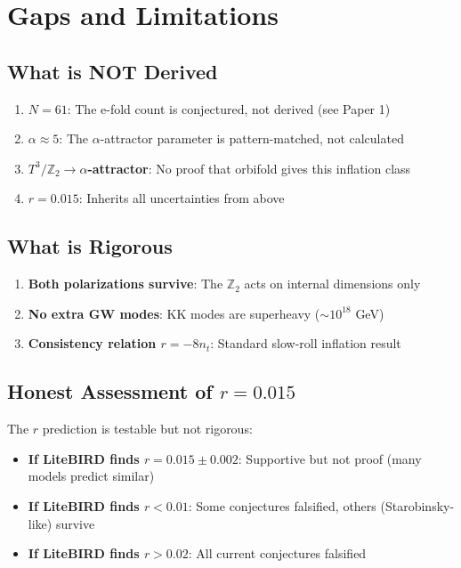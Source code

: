 \documentclass[12pt,a4paper]{article}
\begin{document}
\section{Gaps and Limitations}

\subsection{What is NOT Derived}

\begin{enumerate}
    \item \textbf{$N = 61$}: The e-fold count is conjectured, not derived (see Paper 1)
    \item \textbf{$\alpha \approx 5$}: The $\alpha$-attractor parameter is pattern-matched, not calculated
    \item \textbf{$T^3/\mathbb{Z}_2 \to \alpha$-attractor}: No proof that orbifold gives this inflation class
    \item \textbf{$r = 0.015$}: Inherits all uncertainties from above
\end{enumerate}

\subsection{What is Rigorous}

\begin{enumerate}
    \item \textbf{Both polarizations survive}: The $\mathbb{Z}_2$ acts on internal dimensions only
    \item \textbf{No extra GW modes}: KK modes are superheavy ($\sim 10^{18}$ GeV)
    \item \textbf{Consistency relation $r = -8n_t$}: Standard slow-roll inflation result
\end{enumerate}

\subsection{Honest Assessment of $r = 0.015$}

The $r$ prediction is testable but not rigorous:
\begin{itemize}
    \item \textbf{If LiteBIRD finds $r = 0.015 \pm 0.002$}: Supportive but not proof (many models predict similar)
    \item \textbf{If LiteBIRD finds $r < 0.01$}: Some conjectures falsified, others (Starobinsky-like) survive
    \item \textbf{If LiteBIRD finds $r > 0.02$}: All current conjectures falsified
\end{itemize}
\end{document}
